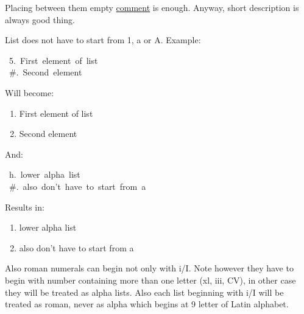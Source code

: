 \documentclass[12pt]{article}
\newcommand{\sups}[1]{\raisebox{0.7ex}{\footnotesize #1}}
\begin{document}
Placing between them empty \href{\#lcomment}{comment} is enough. Anyway, short
description is always good thing.

List does not have to start from 1, a or A. Example:

\begin{ttfamily}\begin{flushleft}
\mbox{~5.~First~element~of~list}\\
\mbox{~\#.~Second~element}\\
\end{flushleft}\end{ttfamily}

Will become:

\begin{enumerate}[label=\arabic*.,start=5]
\item
First element of list

\item
Second element
\end{enumerate}

And:

\begin{ttfamily}\begin{flushleft}
\mbox{~h.~lower~alpha~list}\\
\mbox{~\#.~also~don't~have~to~start~from~a}\\
\end{flushleft}\end{ttfamily}

Results in:

\begin{enumerate}[label=\alph*.,start=8]
\item
lower alpha list

\item
also don't have to start from a
\end{enumerate}

Also roman numerals can begin not only with i/I. Note however they have to
begin with number containing more than one letter (xl, iii, CV), in other case
they will be treated as alpha lists. Also each list beginning with i/I will be
treated as roman, never as alpha which begins at 9\sups{th} letter of Latin
alphabet.

\begin{center}
\end{center}
\hypertarget{lauto-numerated-lists}{}
\end{document}
